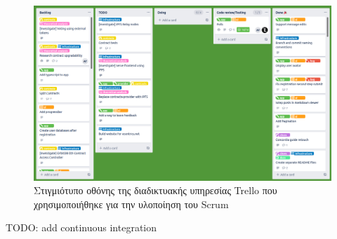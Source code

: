 \begin{figure}[H]
    \centering
    \includegraphics[width=.75\textwidth]{assets/figures/chapter-4/4.2.implementation-methodology-kanban.png}
    \caption{Στιγμιότυπο οθόνης της διαδικτυακής υπηρεσίας Trello που χρησιμοποιήθηκε για την υλοποίηση του Scrum}
    \label{figure:4.2.implementation-methodology-kanban}
\end{figure}

TODO: add continuous integration
